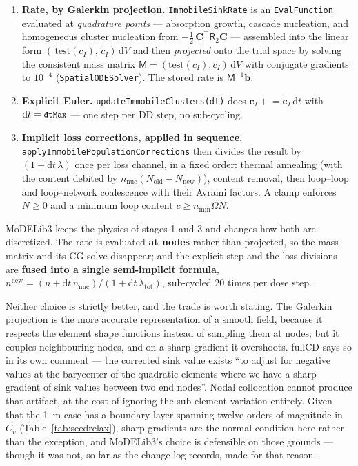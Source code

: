 \documentclass[11pt,a4paper]{article}
\newcommand{\code}[1]{\texttt{\small #1}}
\begin{document}
\begin{enumerate}
\item \textbf{Rate, by Galerkin projection.} \code{ImmobileSinkRate} is an
      \code{EvalFunction} evaluated at \emph{quadrature points} --- absorption
      growth, cascade nucleation, and homogeneous cluster nucleation from
      $-\tfrac12\,\mathbf C^{\!\top} \mathsf R_2 \mathbf C$ --- assembled into the
      linear form $(\,\text{test}(c_I),\,\dot c_I)\,\mathrm dV$ and then
      \emph{projected} onto the trial space by solving the consistent mass
      matrix $\mathsf M=(\text{test}(c_I),c_I)\,\mathrm dV$ with conjugate
      gradients to $10^{-4}$ (\code{SpatialODESolver}). The stored rate is
      $\mathsf M^{-1}\mathbf b$.
\item \textbf{Explicit Euler.} \code{updateImmobileClusters(dt)} does
      $\mathbf c_I \mathrel{+}= \dot{\mathbf c}_I\,\mathrm dt$ with
      $\mathrm dt=\code{dtMax}$ --- one step per DD step, no sub-cycling.
\item \textbf{Implicit loss corrections, applied in sequence.}
      \code{applyImmobilePopulationCorrections} then divides the result by
      $(1+\mathrm dt\,\lambda)$ once per loss channel, in a fixed order:
      thermal annealing (with the content debited by
      $n_{\mathrm{nuc}}(N_{\mathrm{old}}-N_{\mathrm{new}})$), content removal,
      then loop--loop and loop--network coalescence with their Avrami factors.
      A clamp enforces $N\ge0$ and a minimum loop content
      $c \ge n_{\min}\Omega N$.
\end{enumerate}

MoDELib3 keeps the physics of stages 1 and 3 and changes how both are
discretized. The rate is evaluated \textbf{at nodes} rather than projected, so
the mass matrix and its CG solve disappear; and the explicit step and the loss
divisions are \textbf{fused into a single semi-implicit formula},
$n^{\mathrm{new}}=(n+\mathrm dt\,\dot n_{\mathrm{nuc}})/(1+\mathrm dt\,
\lambda_{\mathrm{tot}})$, sub-cycled 20 times per dose step.

Neither choice is strictly better, and the trade is worth stating. The Galerkin
projection is the more accurate representation of a smooth field, because it
respects the element shape functions instead of sampling them at nodes; but it
couples neighbouring nodes, and on a sharp gradient it overshoots. fullCD says
so in its own comment --- the corrected sink value exists ``to adjust for
negative values at the barycenter of the quadratic elements where we have a
sharp gradient of sink values between two end nodes''. Nodal collocation cannot
produce that artifact, at the cost of ignoring the sub-element variation
entirely. Given that the 1~\textmu m case has a boundary layer spanning twelve
orders of magnitude in $C_v$ (Table~\ref{tab:seedrelax}), sharp gradients are
the normal condition here rather than the exception, and MoDELib3's choice is
defensible on those grounds --- though it was not, so far as the change log
records, made for that reason.
\end{document}

